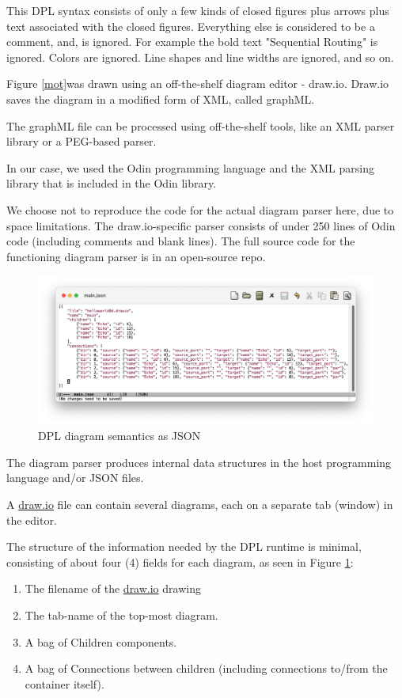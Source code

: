 \documentclass[10pt,anonymous,review]{acmart}
\begin{document}
This DPL syntax consists of only a few kinds of closed figures plus
arrows plus text associated with the closed figures. Everything else is
considered to be a comment, and, is ignored. For example the bold text
"Sequential Routing" is ignored. Colors are ignored. Line shapes and
line widths are ignored, and so on.

Figure \ref{mot}was drawn using an off-the-shelf diagram editor -
draw.io\cite{diagrams_net}. Draw.io saves the diagram in a modified form of XML, called graphML\cite{graphml}.

The graphML file can be processed using off-the-shelf tools, like an XML parser library or a PEG\cite{peg}-based parser\cite{ohmjs}.

In our case, we used the Odin programming language\cite{odin} and the XML parsing library that is included in the Odin library.

We choose not to reproduce the code for the actual diagram parser here, due to space limitations. The draw.io-specific parser consists of under 250 lines of Odin code (including comments and blank lines). The full source code for the functioning diagram parser is in an open-source repo\cite{d2j}.

\begin{figure}
    \includegraphics[scale=0.4]{./media/main.png}
    \caption{DPL diagram semantics as JSON}
    \label{main}
\end{figure}
The diagram parser produces internal data structures in the host programming language and/or JSON\cite{json} files.

A \href{http://draw.io}{draw.io} file can contain several diagrams, each on a separate tab (window) in the editor.

The structure of the information needed by the DPL runtime is minimal, consisting of about four (4) fields for each diagram, as seen in Figure \ref{main}:

\begin{enumerate}
\item The filename of the \href{http://draw.io}{draw.io} drawing

\item The tab-name of the top-most diagram.

\item A bag of Children components.

\item A bag of Connections between children (including connections to/from the container itself).

\end{enumerate}
\end{document}
